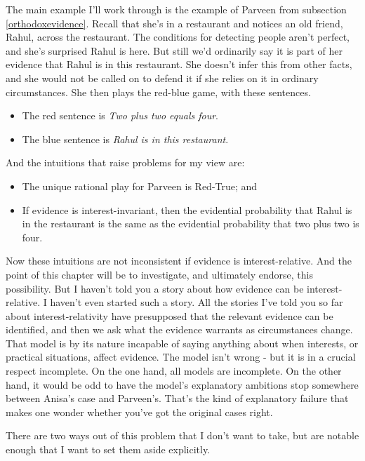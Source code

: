 \documentclass[
  11pt,
]{book}
\providecommand{\tightlist}{%
  \setlength{\itemsep}{0pt}\setlength{\parskip}{0pt}}
\begin{document}
The main example I'll work through is the example of Parveen from subsection \ref{orthodoxevidence}. Recall that she's in a restaurant and notices an old friend, Rahul, across the restaurant. The conditions for detecting people aren't perfect, and she's surprised Rahul is here. But still we'd ordinarily say it is part of her evidence that Rahul is in this restaurant. She doesn't infer this from other facts, and she would not be called on to defend it if she relies on it in ordinary circumstances. She then plays the red-blue game, with these sentences.

\begin{itemize}
\tightlist
\item
  The red sentence is \emph{Two plus two equals four}.
\item
  The blue sentence is \emph{Rahul is in this restaurant}.
\end{itemize}

And the intuitions that raise problems for my view are:

\begin{itemize}
\tightlist
\item
  The unique rational play for Parveen is Red-True; and
\item
  If evidence is interest-invariant, then the evidential probability that Rahul is in the restaurant is the same as the evidential probability that two plus two is four.
\end{itemize}

Now these intuitions are not inconsistent if evidence is interest-relative. And the point of this chapter will be to investigate, and ultimately endorse, this possibility. But I haven't told you a story about how evidence can be interest-relative. I haven't even started such a story. All the stories I've told you so far about interest-relativity have presupposed that the relevant evidence can be identified, and then we ask what the evidence warrants as circumstances change. That model is by its nature incapable of saying anything about when interests, or practical situations, affect evidence. The model isn't wrong - but it is in a crucial respect incomplete. On the one hand, all models are incomplete. On the other hand, it would be odd to have the model's explanatory ambitions stop somewhere between Anisa's case and Parveen's. That's the kind of explanatory failure that makes one wonder whether you've got the original cases right.

There are two ways out of this problem that I don't want to take, but are notable enough that I want to set them aside explicitly.
\end{document}
